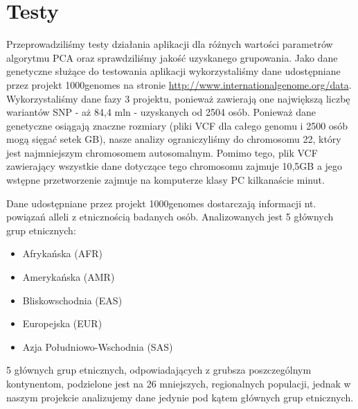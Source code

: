 \documentclass[a4paper]{article}
\begin{document}
\section{Testy}
Przeprowadziliśmy testy działania aplikacji dla różnych wartości parametrów algorytmu PCA oraz sprawdziliśmy jakość uzyskanego grupowania. Jako dane genetyczne służące do testowania aplikacji wykorzystaliśmy dane udostępniane przez projekt 1000genomes na stronie \url{http://www.internationalgenome.org/data}. Wykorzystaliśmy dane fazy 3 projektu, ponieważ zawierają one największą liczbę wariantów SNP - aż 84,4 mln - uzyskanych od 2504 osób. Ponieważ dane genetyczne osiągają znaczne rozmiary (pliki VCF dla całego genomu i 2500 osób mogą sięgać setek GB), nasze analizy ograniczyliśmy do chromosomu 22, który jest najmniejszym chromosomem autosomalnym. Pomimo tego, plik VCF zawierający wszystkie dane dotyczące tego chromosomu zajmuje 10,5GB a jego wstępne przetworzenie zajmuje na komputerze klasy PC kilkanaście minut. 

Dane udostępniane przez projekt 1000genomes dostarczają informacji nt. powiązań alleli z etnicznością badanych osób. Analizowanych jest 5 głównych grup etnicznych:
\begin{itemize}
\item Afrykańska (AFR)
\item Amerykańska (AMR)
\item Bliskowschodnia (EAS)
\item Europejska (EUR)
\item Azja Południowo-Wschodnia (SAS)
\end{itemize}
5 głównych grup etnicznych, odpowiadających z grubsza poszczególnym kontynentom, podzielone jest na 26 mniejszych, regionalnych populacji, jednak w naszym projekcie analizujemy dane jedynie pod kątem głównych grup etnicznych. 
\end{document}
